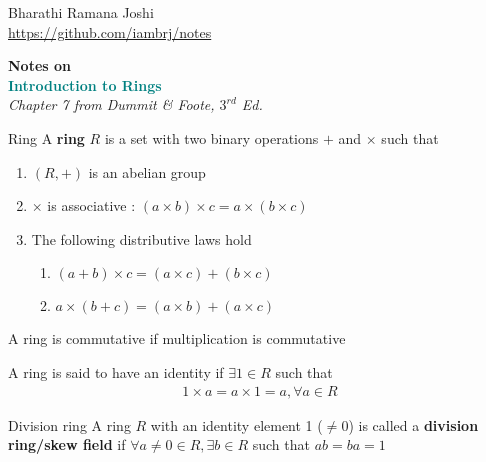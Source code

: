 \documentclass[titlepage, 12pt]{article}
\begin{document}
\begin{titlepage}

	\raggedleft

	\vspace*{\baselineskip}

	{Bharathi Ramana Joshi\\\url{https://github.com/iambrj/notes}}

	\vspace*{0.167\textheight}

	\textbf{\LARGE Notes on}\\[\baselineskip]

	\textbf{\textcolor{teal}{\huge Introduction to Rings}}\\[\baselineskip]

    {\Large \textit{Chapter 7 from Dummit \& Foote, $3^{rd}$ Ed.}}

	\vfill

	\vspace*{3\baselineskip}

\end{titlepage}

\newpage

\begin{definition}{Ring}{}
    A \textbf{ring} $R$ is a set with two binary operations $+$ and $\times$
    such that
    \begin{enumerate}
        \item $(R, +)$ is an abelian group
        \item $\times$ is associative : $(a\times b)\times c = a\times (b\times
            c)$
        \item The following distributive laws hold
            \begin{enumerate}
                \item $(a+b)\times c = (a\times c) + (b\times c)$
                \item $a\times (b+c) = (a\times b) + (a\times c)$
            \end{enumerate}
    \end{enumerate}
\end{definition}

A ring is commutative if multiplication is commutative

A ring is said to have an identity if $\exists 1\in R$ such that
\begin{gather*}
    1\times a = a\times 1 = a, \forall a\in R
\end{gather*}

\begin{definition}{Division ring}{}
    A ring $R$ with an identity element 1 ($\neq 0$) is called a
    \textbf{division ring/skew field} if $\forall a\neq 0\in R, \exists b\in R$
    such that $ab=ba=1$
\end{definition}
\end{document}
